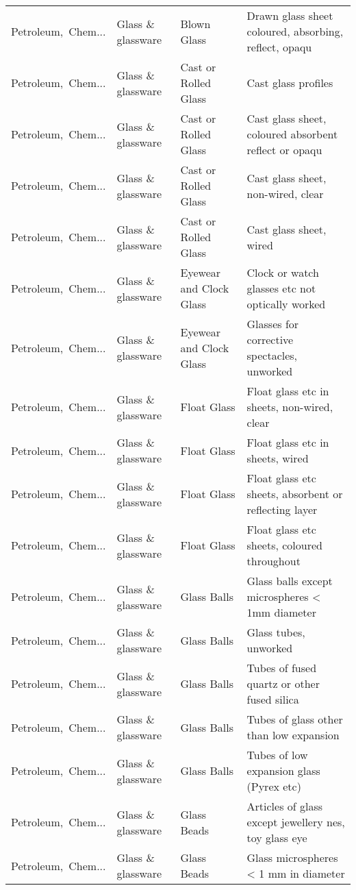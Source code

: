 \begin{appendices}
\begin{xltabular}{\textwidth}{|p{0.10\textwidth}|p{0.25\textwidth}|p{0.24\textwidth}|p{0.31\textwidth}|}
Petroleum,\ Chem... & Glass \& glassware & Blown Glass & Drawn glass sheet coloured, absorbing, reflect, opaqu \\
Petroleum,\ Chem... & Glass \& glassware & Cast or Rolled Glass & Cast glass profiles \\
Petroleum,\ Chem... & Glass \& glassware & Cast or Rolled Glass & Cast glass sheet, coloured absorbent reflect or opaqu \\
Petroleum,\ Chem... & Glass \& glassware & Cast or Rolled Glass & Cast glass sheet, non-wired, clear \\
Petroleum,\ Chem... & Glass \& glassware & Cast or Rolled Glass & Cast glass sheet, wired \\
Petroleum,\ Chem... & Glass \& glassware & Eyewear and Clock Glass & Clock or watch glasses etc not optically worked \\
Petroleum,\ Chem... & Glass \& glassware & Eyewear and Clock Glass & Glasses for corrective spectacles, unworked \\
Petroleum,\ Chem... & Glass \& glassware & Float Glass & Float glass etc in sheets, non-wired, clear \\
Petroleum,\ Chem... & Glass \& glassware & Float Glass & Float glass etc in sheets, wired \\
Petroleum,\ Chem... & Glass \& glassware & Float Glass & Float glass etc sheets, absorbent or reflecting layer \\
Petroleum,\ Chem... & Glass \& glassware & Float Glass & Float glass etc sheets, coloured throughout \\
Petroleum,\ Chem... & Glass \& glassware & Glass Balls & Glass balls except microspheres < 1mm diameter \\
Petroleum,\ Chem... & Glass \& glassware & Glass Balls & Glass tubes, unworked \\
Petroleum,\ Chem... & Glass \& glassware & Glass Balls & Tubes of fused quartz or other fused silica \\
Petroleum,\ Chem... & Glass \& glassware & Glass Balls & Tubes of glass other than low expansion \\
Petroleum,\ Chem... & Glass \& glassware & Glass Balls & Tubes of low expansion glass (Pyrex etc) \\
Petroleum,\ Chem... & Glass \& glassware & Glass Beads & Articles of glass except jewellery nes, toy glass eye \\
Petroleum,\ Chem... & Glass \& glassware & Glass Beads & Glass microspheres < 1 mm in diameter \\

\end{xltabular}
\end{appendices}
